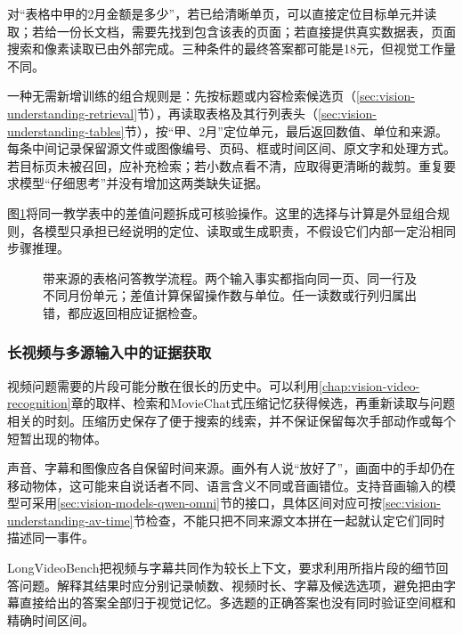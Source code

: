 对“表格中甲的2月金额是多少”，若已给清晰单页，可以直接定位目标单元并读取；若给一份长文档，需要先找到包含该表的页面；若直接提供真实数据表，页面搜索和像素读取已由外部完成。三种条件的最终答案都可能是18元，但视觉工作量不同。

一种无需新增训练的组合规则是：先按标题或内容检索候选页（\ref{sec:vision-understanding-retrieval}节），再读取表格及其行列表头（\ref{sec:vision-understanding-tables}节），按“甲、2月”定位单元，最后返回数值、单位和来源。每条中间记录保留源文件或图像编号、页码、框或时间区间、原文字和处理方式。若目标页未被召回，应补充检索；若小数点看不清，应取得更清晰的裁剪。重复要求模型“仔细思考”并没有增加这两类缺失证据。

图\ref{fig:vision-qa-evidence}将同一教学表中的差值问题拆成可核验操作。这里的选择与计算是外显组合规则，各模型只承担已经说明的定位、读取或生成职责，不假设它们内部一定沿相同步骤推理。

\begin{figure}[htbp]
  \centering
  
  \caption{带来源的表格问答教学流程。两个输入事实都指向同一页、同一行及不同月份单元；差值计算保留操作数与单位。任一读数或行列归属出错，都应返回相应证据检查。}
  \label{fig:vision-qa-evidence}
\end{figure}
\FloatBarrier

\subsubsection{长视频与多源输入中的证据获取}
\label{sec:vision-understanding-video-evidence}

视频问题需要的片段可能分散在很长的历史中。可以利用\ref{chap:vision-video-recognition}章的取样、检索和MovieChat式压缩记忆获得候选，再重新读取与问题相关的时刻。压缩历史保存了便于搜索的线索，并不保证保留每次手部动作或每个短暂出现的物体。

声音、字幕和图像应各自保留时间来源。画外有人说“放好了”，画面中的手却仍在移动物体，这可能来自说话者不同、语言含义不同或音画错位。支持音画输入的模型可采用\ref{sec:vision-models-qwen-omni}节的接口，具体区间对应可按\ref{sec:vision-understanding-av-time}节检查，不能只把不同来源文本拼在一起就认定它们同时描述同一事件。

LongVideoBench把视频与字幕共同作为较长上下文，要求利用所指片段的细节回答问题。解释其结果时应分别记录帧数、视频时长、字幕及候选选项，避免把由字幕直接给出的答案全部归于视觉记忆。多选题的正确答案也没有同时验证空间框和精确时间区间。

